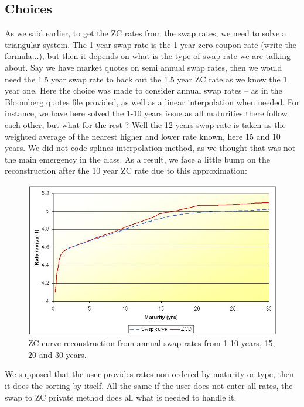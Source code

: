 \subsection{Choices}
\par As we said earlier, to get the ZC rates from the swap rates, we need to solve a triangular system. The 1 year swap rate is the 1 year zero coupon rate (write the formula...), but then it depends on what is the type of swap rate we are talking about. Say we have market quotes on semi annual swap rates, then we would need the 1.5 year swap rate to back out the 1.5 year ZC rate as we know the 1 year one. Here the choice was made to consider annual swap rates -- as in the Bloomberg quotes file provided, as well as a linear interpolation when needed. For instance, we have here solved the 1-10 years issue as all maturities there follow each other, but what for the rest ? Well the 12 years swap rate is taken as the weighted average of the nearest higher and lower rate known, here 15 and 10 years. We did not code splines interpolation method, as we thought that was not the main emergency in the class. As a result, we face a little bump on the reconstruction after the 10 year ZC rate due to this approximation:

\begin{figure}
\begin{center}
        \includegraphics[width=12cm]{yc.jpg}
        \caption{ZC curve reconstruction from annual swap rates from 1-10 years, 15, 20 and 30 years.}
\end{center}
\end{figure}


\par We supposed that the user provides rates non ordered by maturity or type, then it does the sorting by itself. All the same if the user does not enter all rates, the swap to ZC private method does all what is needed to handle it.



